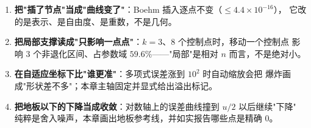 \begin{enumerate}
  \item \textbf{把"插了节点"当成"曲线变了"}：Boehm 插入逐点不变（$\le4.4\times10^{-16}$），
        它改的是表示、是自由度、是重数，不是几何。
  \item \textbf{把局部支撑读成"只影响一点点"}：$k=3$、$8$ 个控制点时，移动一个控制点
        影响 $3$ 个非退化区间、占参数域 $59.6\%$——"局部"是相对 $n$ 而言，不是绝对小。
  \item \textbf{在自适应坐标下比"谁更准"}：多项式误差涨到 $10^2$ 时自动缩放会把
        爆炸画成"形状差不多"；本章主轴固定并显式给出溢出标记。
  \item \textbf{把地板以下的下降当成收敛}：对数轴上的误差曲线撞到 $u/2$ 以后继续"下降"
        纯粹是舍入噪声，本章画出地板参考线，并如实报告哪些点是精确 $0$。
\end{enumerate}
